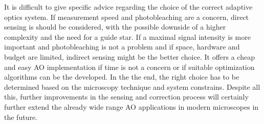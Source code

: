 \noindent It is difficult to give specific advice regarding the choice of the correct adaptive optics system. If measurement speed and photobleaching are a concern, direct sensing is should be considered, with the possible downside of a higher complexity and the need for a guide star. 
If a maximal signal intensity is more important and photobleaching is not a problem and if space, hardware and budget are limited, indirect sensing might be the better choice. It offers a cheap and easy AO implementation if time is not a concern or if suitable optimization algorithms can be the developed. In the the end, the right choice has to be  determined based on the microscopy technique and system constrains. Despite all this, further improvements in the sensing and correction process will certainly further extend the already wide range AO applications in modern microscopes in the future. 
